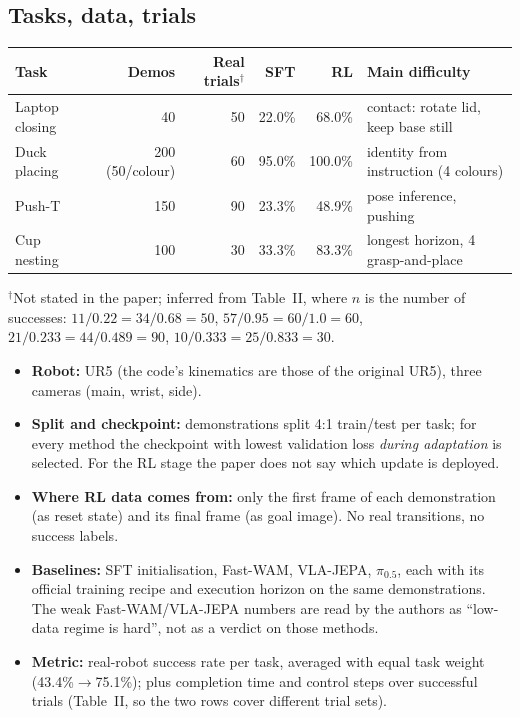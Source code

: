 \documentclass[11pt,a4paper]{article}
\theoremstyle{remark}
\begin{document}
\subsection{Tasks, data, trials}
\begin{center}
\small
\begin{tabular}{@{}lrrrrl@{}}
\toprule
Task & Demos & Real trials$^\dagger$ & SFT & RL & Main difficulty\\
\midrule
Laptop closing & 40 & 50 & 22.0\% & 68.0\% & contact: rotate lid, keep base still\\
Duck placing & 200 (50/colour) & 60 & 95.0\% & 100.0\% & identity from instruction (4 colours)\\
Push-T & 150 & 90 & 23.3\% & 48.9\% & pose inference, pushing\\
Cup nesting & 100 & 30 & 33.3\% & 83.3\% & longest horizon, 4 grasp-and-place\\
\bottomrule
\end{tabular}

\smallskip
{\footnotesize $^\dagger$Not stated in the paper; inferred from Table~II, where $n$ is the number of successes: $11/0.22=34/0.68=50$, $57/0.95=60/1.0=60$, $21/0.233=44/0.489=90$, $10/0.333=25/0.833=30$.}
\end{center}

\begin{itemize}
\item \textbf{Robot:} UR5 (the code's kinematics are those of the original UR5), three cameras (main, wrist, side).
\item \textbf{Split and checkpoint:} demonstrations split 4:1 train/test per task; for every method the checkpoint with lowest validation loss \emph{during adaptation} is selected. For the RL stage the paper does not say which update is deployed.
\item \textbf{Where RL data comes from:} only the first frame of each demonstration (as reset state) and its final frame (as goal image). No real transitions, no success labels.
\item \textbf{Baselines:} SFT initialisation, Fast-WAM, VLA-JEPA, $\pi_{0.5}$, each with its official training recipe and execution horizon on the same demonstrations. The weak Fast-WAM/VLA-JEPA numbers are read by the authors as ``low-data regime is hard'', not as a verdict on those methods.
\item \textbf{Metric:} real-robot success rate per task, averaged with equal task weight (43.4\%$\to$75.1\%); plus completion time and control steps over successful trials (Table~II, so the two rows cover different trial sets).
\end{itemize}
\end{document}
